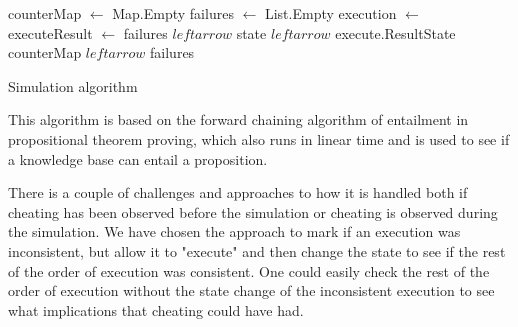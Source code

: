 \begin{algorithm}[H]
\begin{algorithmic}
			\State
			
			\State counterMap $\leftarrow$ Map.Empty
				\State {}
			\EndFor
			\State failures $\leftarrow$ List.Empty
				\State execution $\leftarrow$ 
				\State executeResult $\leftarrow$ 
					\State failures $leftarrow$ 
				\EndIf
				\State state $leftarrow$ execute.ResultState
				\State counterMap $leftarrow$ 
			\EndWhile
			\Return failures
			\EndFunction
			
			
		\end{algorithmic}
		\caption{Simulation algorithm}
		\label{alg:simulation}
	\end{algorithm}
	
	\newpar This algorithm is based on the forward chaining algorithm of entailment in propositional theorem proving, which also runs in linear time and is used to see if a knowledge base can entail a proposition. 
	
    \newpar There is a couple of challenges and approaches to how it is handled both if cheating has been observed before the simulation or cheating is observed during the simulation. We have chosen the approach to mark if an execution was inconsistent, but allow it to "execute" and then change the state to see if the rest of the order of execution was consistent. One could easily check the rest of the order of execution without the state change of the inconsistent execution to see what implications that cheating could have had.